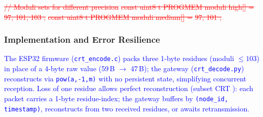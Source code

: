 \documentclass[pdflatex,sn-mathphys-num]{sn-jnl}
\theoremstyle{thmstyleone}
\theoremstyle{thmstyletwo}
\theoremstyle{thmstylethree}
\begin{document}
{\textcolor{red}{\sout{// Moduli sets for different precision}}
\textcolor{red}{\sout{const uint8 t PROGMEM moduli high[] =}}
\textcolor{red}{\sout{97, 101, 103 ;}}
\textcolor{red}{\sout{const uint8 t PROGMEM moduli medium[] =}}
\textcolor{red}{\sout{97, 101 ;}}
\subsubsection{Implementation and Error Resilience}
\textcolor{blue}{The ESP32 firmware (\texttt{crt\_encode.c}) packs three 1-byte residues (moduli $\leq 103$) in place of a 4-byte raw value (59\,B $\to$ 47\,B); the gateway (\texttt{crt\_decode.py}) reconstructs via \texttt{pow(a,-1,m)} with no persistent state, simplifying concurrent reception. Loss of one residue allows perfect reconstruction (subset CRT \cite{shoup2009computational}): each packet carries a 1-byte residue-index; the gateway buffers by \texttt{(node\_id, timestamp)}, reconstructs from two received residues, or awaits retransmission.}

}
\end{document}
